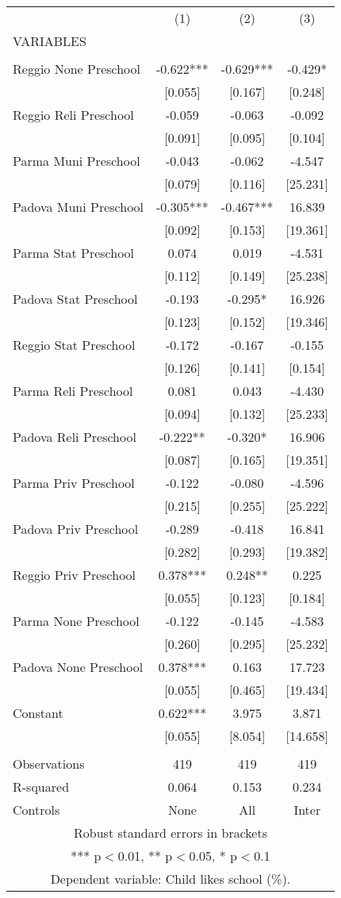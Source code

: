 \begin{tabular}{lccc} \hline
 & (1) & (2) & (3) \\
VARIABLES &  &  &  \\ \hline
 &  &  &  \\
Reggio None Preschool & -0.622*** & -0.629*** & -0.429* \\
 & [0.055] & [0.167] & [0.248] \\
Reggio Reli Preschool & -0.059 & -0.063 & -0.092 \\
 & [0.091] & [0.095] & [0.104] \\
Parma Muni Preschool & -0.043 & -0.062 & -4.547 \\
 & [0.079] & [0.116] & [25.231] \\
Padova Muni Preschool & -0.305*** & -0.467*** & 16.839 \\
 & [0.092] & [0.153] & [19.361] \\
Parma Stat Preschool & 0.074 & 0.019 & -4.531 \\
 & [0.112] & [0.149] & [25.238] \\
Padova Stat Preschool & -0.193 & -0.295* & 16.926 \\
 & [0.123] & [0.152] & [19.346] \\
Reggio Stat Preschool & -0.172 & -0.167 & -0.155 \\
 & [0.126] & [0.141] & [0.154] \\
Parma Reli Preschool & 0.081 & 0.043 & -4.430 \\
 & [0.094] & [0.132] & [25.233] \\
Padova Reli Preschool & -0.222** & -0.320* & 16.906 \\
 & [0.087] & [0.165] & [19.351] \\
Parma Priv Preschool & -0.122 & -0.080 & -4.596 \\
 & [0.215] & [0.255] & [25.222] \\
Padova Priv Preschool & -0.289 & -0.418 & 16.841 \\
 & [0.282] & [0.293] & [19.382] \\
Reggio Priv Preschool & 0.378*** & 0.248** & 0.225 \\
 & [0.055] & [0.123] & [0.184] \\
Parma None Preschool & -0.122 & -0.145 & -4.583 \\
 & [0.260] & [0.295] & [25.232] \\
Padova None Preschool & 0.378*** & 0.163 & 17.723 \\
 & [0.055] & [0.465] & [19.434] \\
Constant & 0.622*** & 3.975 & 3.871 \\
 & [0.055] & [8.054] & [14.658] \\
 &  &  &  \\
Observations & 419 & 419 & 419 \\
R-squared & 0.064 & 0.153 & 0.234 \\
 Controls & None & All & Inter \\ \hline
\multicolumn{4}{c}{ Robust standard errors in brackets} \\
\multicolumn{4}{c}{ *** p$<$0.01, ** p$<$0.05, * p$<$0.1} \\
\multicolumn{4}{c}{ Dependent variable: Child likes school (\%).} \\
\end{tabular}
